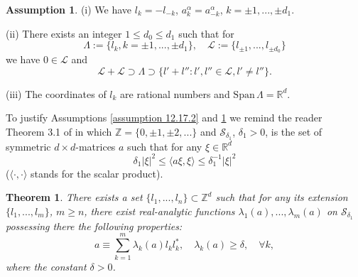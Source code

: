 \documentclass[11pt, reqno]{amsart}
\newtheorem{theorem}{Theorem}[section]
\theoremstyle{definition}
\newtheorem{assumption}{Assumption}[section]
\theoremstyle{remark}
\begin{document}
\begin{assumption}
                                \label{assumption 12.17.1}
(i) We have $l_{k}=-l_{-k}$, 
$a^{\alpha}_{k}=a^{\alpha}_{-k}$, $k=\pm1,...,\pm d_{1}$.

(ii) There exists an integer $1\leq d_{0}\leq d_{1}$ such that
for   
$$
\Lambda :=\{l_{k},k=\pm1,...,\pm d_{1}\} ,\quad
  {\mathcal{L}} :=\{ l_{\pm1},..., l_{\pm d_{0}} \} 
$$
we have $0\in{\mathcal{L}}$ and
$$
{\mathcal{L}}+{\mathcal{L}}\supset \Lambda\supset\{l'+l'':l',l''\in{\mathcal{L}},l'\ne l'' 
 \}.
$$

(iii) The coordinates of $l_{k}$ are rational numbers
and $\text{Span}\,\Lambda={\mathbb{R}}^{d}$.
\end{assumption}
 
To justify Assumptions \ref{assumption 12.17.2}
 and \ref{assumption 12.17.1} we remind the reader
Theorem 3.1 of \cite{Kr11} in which ${\mathbb{Z}}=\{0,\pm 1,\pm 2,...\}$
and
${\mathcal{S}}_{\delta_{1}}$, $\delta_{1}>0$, is the set  
of symmetric $d\times d$-matrices $a$
 such that for any $\xi\in{\mathbb{R}}^{d}$
$$
\delta_{1}|\xi|^{2}\leq \langle a\xi,\xi\rangle
\leq\delta_{1}^{-1}|\xi|^{2} 
$$
($\langle \cdot,\cdot\rangle$ stands for the scalar
product).
\begin{theorem}
                                  \label{theorem 4.7.1}
There exists a set $\{l_{1},...,l_{n}\}
\subset {\mathbb{Z}}^{d}$     such that
for any its extension $\{l_{1},...,l_{m}\}$, $m\geq n$,
  there exist
real-analytic functions $\lambda_{1}(a),...,
\lambda_{m}(a)$ on ${\mathcal{S}}_{\delta_{1}}$ possessing there
the following properties:
$$
a\equiv\sum_{k=1}^{m}\lambda_{k}(a)l_{k}l_{k}^{*},
\quad \lambda_{k}(a)\geq\delta 
,\quad \forall k,
$$
where the constant $\delta >0$.

\end{theorem}
\end{document}
